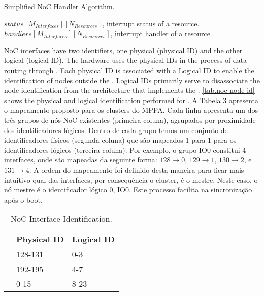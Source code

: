 			\begin{algorithm}
				\caption{Simplified NoC Handler Algorithm.}%
				\label{alg.noc-handler}%
				\begin{algorithmic}[1]
					\Require $status[M_{Interfaces}][N_{Resources}]$, interrupt status of a resource.
					\Require $handlers[M_{Interfaces}][N_{Resources}]$, interrupt handler of a resource.
							\EndIf
						\EndFor
					\EndFor
					\EndProcedure
				\end{algorithmic}%
			\end{algorithm}

			NoC interfaces have two identifiers, one physical (physical ID) and the other logical (logical ID).
			The hardware uses the physical IDs in the process of data routing through \noc.
			Each physical ID is associated with a Logical ID to enable the identification
			of \noc nodes outside the \hal.
			Logical IDs primarily serve to disassociate the node identification from the
			architecture that implements the \hal.
				\autoref{tab.noc-node-id} shows the physical and logical identification performed for \mppa.
			A Tabela 3 apresenta o mapeamento proposto para os clusters do MPPA.
			Cada linha apresenta um dos três grupos de nós NoC existentes (primeira coluna), agrupados por proximidade dos identificadores lógicos.
			Dentro de cada grupo temos um conjunto de identificadores físicos (segunda coluna) que são mapeados 1 para 1 para os identificadores lógicos (terceira coluna).
			Por exemplo, o grupo IO0 constitui 4 interfaces, onde são mapeadas da seguinte forma: $128 \to 0$, $129 \to 1$, $130 \to 2$, e $131 \to 4$.
			A ordem do mapeamento foi definido desta maneira para ficar mais intuitivo qual das interfaces, por consequência o cluster, é o mestre.
			Neste caso, o nó mestre é o identificador lógico 0, IO0.
			Este processo facilita na sincronização após o boot.

			\begin{table}[!tb]
				\centering%
				\caption{NoC Interface Identification.}%
				\label{tab.noc-node-id}%

				\begin{tabular}{l|l|l|}
					\cline{2-3}
															& \textbf{Physical ID} & \textbf{Logical ID} \\ \hline
					\multicolumn{1}{|l|}{\textbf{\iocluster0}} & 128-131              & 0-3                 \\ \hline
					\multicolumn{1}{|l|}{\textbf{\iocluster1}} & 192-195              & 4-7                 \\ \hline
					\multicolumn{1}{|l|}{\textbf{\ccluster}}   & 0-15                 & 8-23                \\ \hline
				\end{tabular}

			\end{table}

